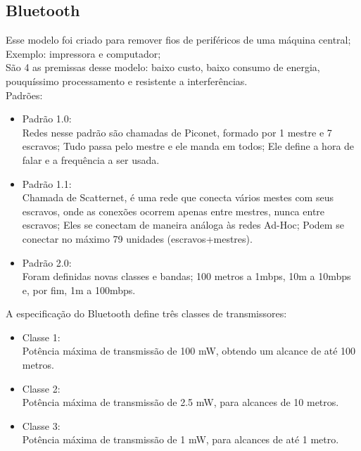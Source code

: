 \documentclass{article}
\begin{document}
\subsection{Bluetooth}

Esse modelo foi criado para remover fios de periféricos de uma máquina central;
Exemplo: impressora e computador;\\
São 4 as premissas desse modelo: baixo custo, baixo consumo de energia,
pouquíssimo processamento e resistente a interferências.\\
Padrões:
\begin{itemize}
	\item Padrão 1.0: \\ Redes nesse padrão são chamadas de Piconet, formado
por 1 mestre e 7 escravos; Tudo passa pelo mestre e ele manda em todos; Ele
define a hora de falar e a frequência a ser usada.
	\item Padrão 1.1: \\ Chamada de Scatternet, é uma rede que conecta
vários mestes com seus escravos, onde as conexões ocorrem apenas entre mestres,
nunca entre escravos; Eles se conectam de maneira análoga às redes Ad-Hoc; Podem
se conectar no máximo 79 unidades (escravos+mestres).
	\item Padrão 2.0: \\ Foram definidas novas classes e bandas; 100 metros a
1mbps, 10m a 10mbps e, por fim, 1m a 100mbps.
\end{itemize}

A especificação do Bluetooth define três classes de transmissores:

\begin{itemize}
	\item Classe 1:\\ Potência máxima de transmissão de 100 mW, obtendo um
alcance de até 100 metros. 
	\item Classe 2:\\ Potência máxima de transmissão de 2.5 mW, para
alcances de 10 metros.
	\item Classe 3:\\ Potência máxima de transmissão de 1 mW, para alcances
de até 1 metro.
\end{itemize}
\end{document}
